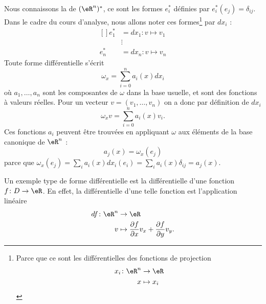 Nous connaissons la  de $(\eR^n)^*$, ce sont les formes $e^*_i$ définies par $e^*_i(e_j)=\delta_{ij}$. Dans le cadre du cours d'analyse, nous allons noter ces formes\footnote{Parce que ce sont les différentielles des fonctions de projection
\begin{equation}
	\begin{aligned}
			x_i\colon \eR^n&\to \eR \\
			x&\mapsto x_i 
		\end{aligned}
	\end{equation}
}
par $dx_i$ :
\begin{equation}
	\begin{aligned}[]
		e^*_1&=dx_1\colon v\mapsto v_1	\\
			&\vdots			\\
		e^*_n&=dx_n\colon v\mapsto v_n
	\end{aligned}
\end{equation}
Toute forme différentielle s'écrit
\begin{equation}
  \omega_x = \sum_{i=0}^n a_i(x) d x_i
\end{equation}
où $a_1,\ldots,a_n$ sont les composantes de $\omega$ dans la base usuelle, et sont des fonctions à valeurs réelles. Pour un vecteur $v = (v_1,\ldots,v_n)$ on a donc par définition de $d x_i$
\begin{equation}
  \omega_x v = \sum_{i=0}^n a_i(x) v_i.
\end{equation}
Ces fonctions $a_i$ peuvent être trouvées en appliquant $\omega$ aux éléments de la base canonique de $\eR^n$ :
\begin{equation}
	a_j(x)=\omega_x(e_j)
\end{equation}
parce que $\omega_x(e_j)=\sum_ia_i(x)dx_i(e_i)=\sum_ia_i(x)\delta_{ij}=a_j(x)$.




\begin{example}
    Un exemple type de forme différentielle est la différentielle d'une fonction $f\colon D\to \eR$. En effet, la différentielle d'une telle fonction est l'application linéaire
    \begin{equation}
        \begin{aligned}
            df\colon \eR^n&\to \eR \\
            v&\mapsto \frac{ \partial f }{ \partial x }v_x+\frac{ \partial f }{ \partial y }v_y. 
        \end{aligned}
    \end{equation}
\end{example}

